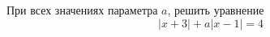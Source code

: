 \begin{ex}
	\begin{condition}
		При всех значениях параметра \( a \), решить уравнение
		\[ |x+3|+a|x-1|=4 \]
	\end{condition}
\end{ex}